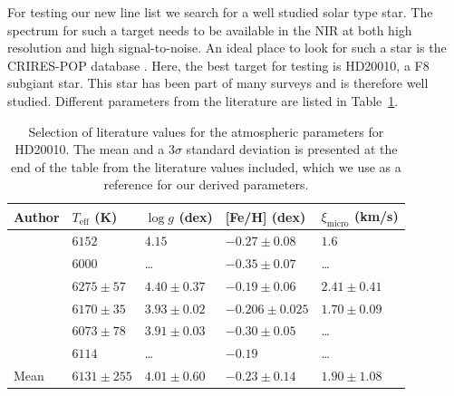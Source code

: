 \documentclass{aa}
\begin{document}
For testing our new line list we search for a well studied solar type
star. The spectrum for such a target needs to be available in the NIR at
both high resolution and high signal-to-noise. An ideal place to look
for such a star is the CRIRES-POP database \citep{Lebzelter2012}. Here,
the best target for testing is HD20010, a F8 subgiant star. This star
has been part of many surveys and is therefore well studied. Different
parameters from the literature are listed in Table~\ref{tab:parameters}.

\begin{table}[htb!]
    \caption{Selection of literature values for the atmospheric
    parameters for HD20010. The mean and a $3 \sigma$ standard
    deviation is presented at the end of the table from the literature
    values included, which we use as a reference for our
    derived parameters.}
    \label{tab:parameters}
    \centering
    \begin{tabular}{l|llll}
      \hline\hline
     Author                 & $T_\mathrm{eff}$ (K) & $\log g$ (dex)  &  [Fe/H] (dex)    & $\xi_\mathrm{micro}$ (km/s)  \\
      \hline
    \cite{Balachandran1990} & $6152$               & $4.15$          & $-0.27\pm0.08$   & $1.6$                        \\
    \cite{Favata1997}       & $6000$               & \ldots          & $-0.35\pm0.07$   & \ldots                       \\
    \cite{Santos2004}       & $6275\pm57$          & $4.40\pm0.37$   & $-0.19\pm0.06$   & $2.41\pm0.41$                \\
    \cite{Gonzalez2010}     & $6170\pm35$          & $3.93\pm0.02$   & $-0.206\pm0.025$ & $1.70\pm0.09$                \\
    \cite{Ramirez2012}      & $6073\pm78$          & $3.91\pm0.03$   & $-0.30\pm0.05$   & \ldots                       \\
    \cite{Mortier2013}      & $6114$               & \ldots          & $-0.19$          & \ldots                       \\
      \hline
      Mean                  & $6131\pm255$         & $4.01\pm0.60$   & $-0.23\pm0.14$   & $1.90\pm1.08$                \\
      \hline
    \end{tabular}
\end{table}
\end{document}
